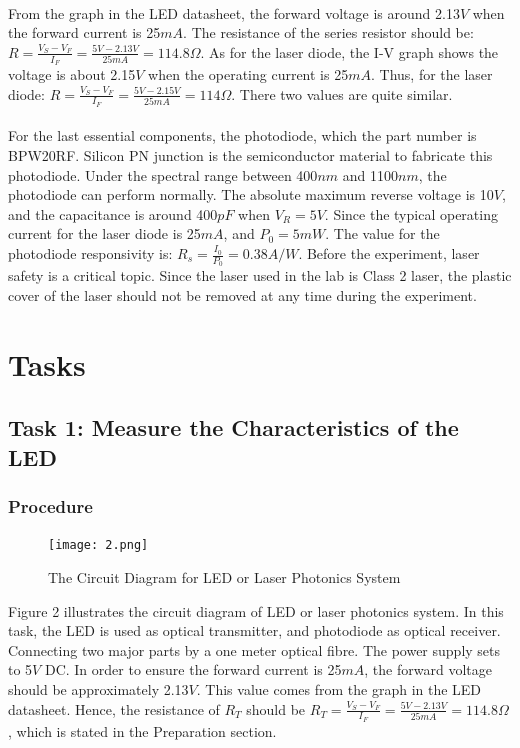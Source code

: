 \documentclass[12pt]{article}
\begin{document}
    \paragraph{}
    From the graph in the LED datasheet, the forward voltage is around 2.13$V$ when the forward current is 25$mA$. The resistance of the series resistor should be: $R=\frac{V_{S}-V_{F}}{I_{F}}=\frac{5V-2.13V}{25mA}=114.8\Omega$. As for the laser diode, the I-V graph shows the voltage is about 2.15$V$ when the operating current is 25$mA$. Thus, for the laser diode: $R=\frac{V_{S}-V_{F}}{I_{F}}=\frac{5V-2.15V}{25mA}=114\Omega$. There two values are quite similar.
    
    \paragraph{}
    For the last essential components, the photodiode, which the part number is BPW20RF\cite{5}. Silicon PN junction is the semiconductor material to fabricate this photodiode. Under the spectral range between 400$nm$ and 1100$nm$, the photodiode can perform normally. The absolute maximum reverse voltage is 10$V$, and the capacitance is around 400$pF$ when $V_{R}=5V$. Since the typical operating current for the laser diode is 25$mA$, and $P_{0}=5mW$. The value for the photodiode responsivity is: $R_{s}=\frac{I_{0}}{P_{0}}=0.38A/W$. Before the experiment, laser safety is a critical topic. Since the laser used in the lab is Class 2 laser, the plastic cover of the laser should not be removed at any time during the experiment.
    
    \section{Tasks}
    \subsection{Task 1: Measure the Characteristics of the LED}
    \subsubsection{Procedure}
    \paragraph{}
    \begin{figure}[H]
    \centering
    \texttt{[image: 2.png]}
    \caption{The Circuit Diagram for LED or Laser Photonics System\cite{6}}
    \end{figure}
    Figure 2 illustrates the circuit diagram of LED or laser photonics system. In this task, the LED is used as optical transmitter, and photodiode as optical receiver. Connecting two major parts by a one meter optical fibre. The power supply sets to 5$V$ DC. In order to ensure the forward current is 25$mA$, the forward voltage should be approximately 2.13$V$. This value comes from the graph in the LED datasheet. Hence, the resistance of $R_{T}$ should be $R_{T}=\frac{V_{S}-V_{F}}{I_{F}}=\frac{5V-2.13V}{25mA}=114.8\Omega$, which is stated in the Preparation section.
    
\end{document}
